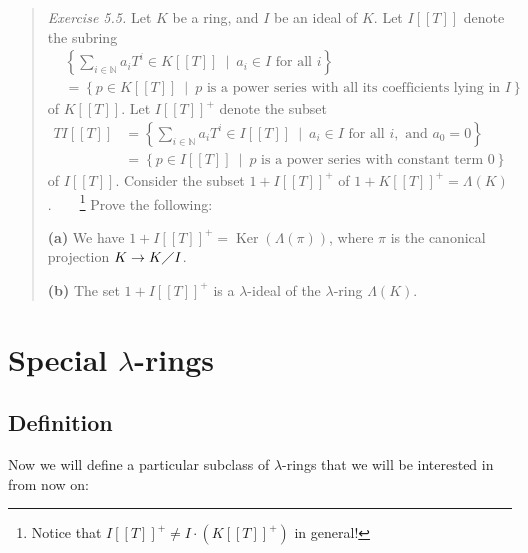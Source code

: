 \documentclass[numbers=enddot,12pt,final,onecolumn,notitlepage]{scrartcl}%
\begin{document}
\begin{quotation}
\textit{Exercise 5.5.} Let $K$ be a ring, and $I$ be an ideal of $K$. Let
$I\left[  \left[  T\right]  \right]  $ denote the subring%
\begin{align*}
&  \left\{  \sum_{i\in\mathbb{N}}a_{i}T^{i}\in K\left[  \left[  T\right]
\right]  \ \mid\ a_{i}\in I\text{ for all }i\right\} \\
&  =\left\{  p\in K\left[  \left[  T\right]  \right]  \ \mid\ p\text{ is a
power series with all its coefficients lying in }I\right\}
\end{align*}
of $K\left[  \left[  T\right]  \right]  $. Let $I\left[  \left[  T\right]
\right]  ^{+}$ denote the subset%
\begin{align*}
TI\left[  \left[  T\right]  \right]   &  =\left\{  \sum_{i\in\mathbb{N}}%
a_{i}T^{i}\in I\left[  \left[  T\right]  \right]  \ \mid\ a_{i}\in I\text{ for
all }i,\text{ and }a_{0}=0\right\} \\
&  =\left\{  p\in I\left[  \left[  T\right]  \right]  \ \mid\ p\text{ is a
power series with constant term }0\right\}
\end{align*}
of $I\left[  \left[  T\right]  \right]  $. Consider the subset $1+I\left[
\left[  T\right]  \right]  ^{+}$ of $1+K\left[  \left[  T\right]  \right]
^{+}=\Lambda\left(  K\right)  $.\ \ \ \ \footnote{Notice that $I\left[
\left[  T\right]  \right]  ^{+}\neq I\cdot\left(  K\left[  \left[  T\right]
\right]  ^{+}\right)  $ in general!} Prove the following:

\textbf{(a)} We have $1+I\left[  \left[  T\right]  \right]  ^{+}%
=\operatorname*{Ker}\left(  \Lambda\left(  \pi\right)  \right)  $, where $\pi$
is the canonical projection $K\rightarrow K\diagup I$.

\textbf{(b)} The set $1+I\left[  \left[  T\right]  \right]  ^{+}$ is a
$\lambda$-ideal of the $\lambda$-ring $\Lambda\left(  K\right)  $.
\end{quotation}

\section{Special $\lambda$-rings}

\subsection{Definition}

Now we will define a particular subclass of $\lambda$-rings that we will be
interested in from now on:
\end{document}
